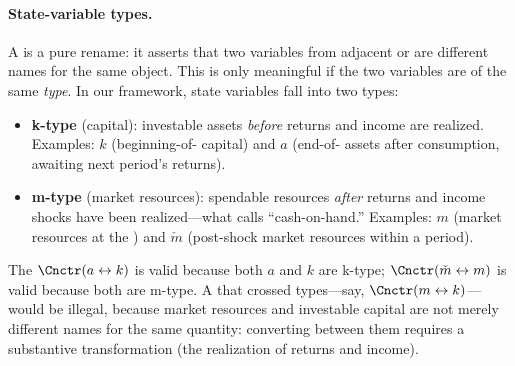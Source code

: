 \documentclass[titlepage, headings=optiontotocandhead]{econark}
\begin{document}
\hypertarget{state-variable-types}{}
\paragraph{State-variable types.}  A {\Cnct} is a pure rename: it asserts that two variables from adjacent {\stgs} or {\intervals} are different names for the same object.  This is only meaningful if the two variables are of the same \textit{type}.  In our framework, state variables fall into two types:
\begin{itemize}
\item \textbf{k-type} (capital): investable assets \textit{before} returns and income are realized.  Examples: $k$ (beginning-of-{\interval} capital) and $a$ (end-of-{\interval} assets after consumption, awaiting next period's returns).
\item \textbf{m-type} (market resources): spendable resources \textit{after} returns and income shocks have been realized---what \citet{deatonUnderstandingC} calls ``cash-on-hand.''  Examples: $m$ (market resources at the {\Decision} {\prch}) and $\check{m}$ (post-shock market resources within a period).
\end{itemize}
\noindent The {\Cnct} $\Cnctr(a \leftrightarrow k)$ is valid because both $a$ and $k$ are k-type; $\Cnctr(\check{m} \leftrightarrow m)$ is valid because both are m-type.  A {\Cnct} that crossed types---say, $\Cnctr(m \leftrightarrow k)$---would be illegal, because market resources and investable capital are not merely different names for the same quantity: converting between them requires a substantive transformation (the realization of returns and income).
\end{document}
